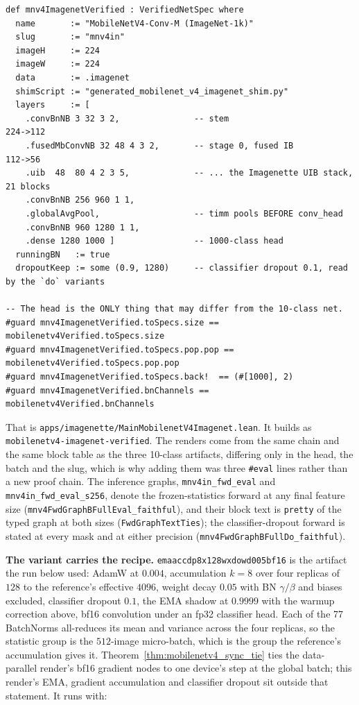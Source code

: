 \begin{verbatim}
def mnv4ImagenetVerified : VerifiedNetSpec where
  name       := "MobileNetV4-Conv-M (ImageNet-1k)"
  slug       := "mnv4in"
  imageH     := 224
  imageW     := 224
  data       := .imagenet
  shimScript := "generated_mobilenet_v4_imagenet_shim.py"
  layers     := [
    .convBnNB 3 32 3 2,               -- stem                       224->112
    .fusedMbConvNB 32 48 4 3 2,       -- stage 0, fused IB          112->56
    .uib  48  80 4 2 3 5,             -- ... the Imagenette UIB stack, 21 blocks
    .convBnNB 256 960 1 1,
    .globalAvgPool,                   -- timm pools BEFORE conv_head
    .convBnNB 960 1280 1 1,
    .dense 1280 1000 ]                -- 1000-class head
  runningBN   := true
  dropoutKeep := some (0.9, 1280)     -- classifier dropout 0.1, read by the `do` variants

-- The head is the ONLY thing that may differ from the 10-class net.
#guard mnv4ImagenetVerified.toSpecs.size == mobilenetv4Verified.toSpecs.size
#guard mnv4ImagenetVerified.toSpecs.pop.pop == mobilenetv4Verified.toSpecs.pop.pop
#guard mnv4ImagenetVerified.toSpecs.back!  == (#[1000], 2)
#guard mnv4ImagenetVerified.bnChannels == mobilenetv4Verified.bnChannels
\end{verbatim}

\noindent That is \texttt{apps/imagenette/MainMobilenetV4Imagenet.lean}.
It builds as \texttt{mobilenetv4-imagenet-verified}. The renders come
from the same chain and the same block table as the three 10-class
artifacts, differing only in the head, the batch and the slug,
which is why adding them was three \texttt{\#eval} lines rather than a
new proof chain. The inference graphs, \texttt{mnv4in\_fwd\_eval} and
\texttt{mnv4in\_fwd\_eval\_s256}, denote the frozen-statistics forward at any
final feature size (\texttt{mnv4FwdGraphBFullEval\_faithful}), and their
block text is \texttt{pretty} of the typed graph at both sizes
(\texttt{FwdGraphTextTies}); the classifier-dropout forward is stated at
every mask and at either precision (\texttt{mnv4FwdGraphBFullDo\_faithful}).

\textbf{The variant carries the recipe.}
\texttt{emaaccdp8x128wxdowd005bf16} is the artifact the run below used:
AdamW at $0.004$, accumulation $k = 8$ over four replicas of $128$ to
the reference's effective $4096$, weight decay $0.05$ with BN
$\gamma/\beta$ and biases excluded, classifier dropout $0.1$, the EMA
shadow at $0.9999$ with the warmup correction above, bf16 convolution
under an fp32 classifier head. Each of the 77 BatchNorms all-reduces its mean and
variance across the four replicas, so the statistic group is the
$512$-image micro-batch, which is the group the reference's
accumulation gives it. Theorem~\ref{thm:mobilenetv4_sync_tie} ties the
data-parallel render's bf16 gradient nodes to one device's step at the
global batch; this render's EMA, gradient accumulation and classifier dropout
sit outside that statement. It runs with:

